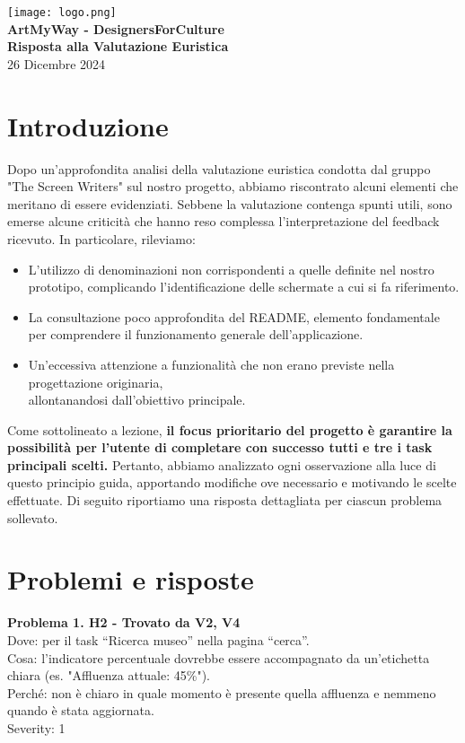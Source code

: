 \documentclass{article}
\begin{document}
\begin{center}
    \texttt{[image: logo.png]} \\[1em]
    {\LARGE \textbf{ArtMyWay - DesignersForCulture}} \\[0.5em]
    {\Large \textbf{Risposta alla Valutazione Euristica}} \\[1.5em]
    {\large 26 Dicembre 2024}
\end{center}

\section*{Introduzione}

Dopo un'approfondita analisi della valutazione euristica condotta dal gruppo "The Screen Writers" sul nostro progetto, abbiamo riscontrato alcuni elementi che meritano di essere evidenziati. Sebbene la valutazione contenga spunti utili, sono emerse alcune criticità che hanno reso complessa l’interpretazione del feedback ricevuto. In particolare, rileviamo:
\begin{itemize}
    \item L’utilizzo di denominazioni non corrispondenti a quelle definite nel nostro prototipo, complicando l'identificazione delle schermate a cui si fa riferimento.
    \item La consultazione poco approfondita del README, elemento fondamentale per comprendere il funzionamento generale dell’applicazione.
    \item Un'eccessiva attenzione a funzionalità che non erano previste nella progettazione originaria, \\ allontanandosi dall’obiettivo principale.
\end{itemize}
Come sottolineato a lezione, \textbf{il focus prioritario del progetto è garantire la possibilità per l’utente di completare con successo tutti e tre i task principali scelti.} Pertanto, abbiamo analizzato ogni osservazione alla luce di questo principio guida, apportando modifiche ove necessario e motivando le scelte effettuate. Di seguito riportiamo una risposta dettagliata per ciascun problema sollevato.

\section*{Problemi e risposte}

\noindent \textbf{Problema 1. H2 - Trovato da V2, V4} \\
Dove: per il task “Ricerca museo” nella pagina “cerca”. \\
Cosa: l’indicatore percentuale dovrebbe essere accompagnato da un'etichetta chiara (es. "Affluenza attuale: 45\%"). \\
Perché: non è chiaro in quale momento è presente quella affluenza e nemmeno quando è stata aggiornata. \\
Severity: 1
\end{document}
